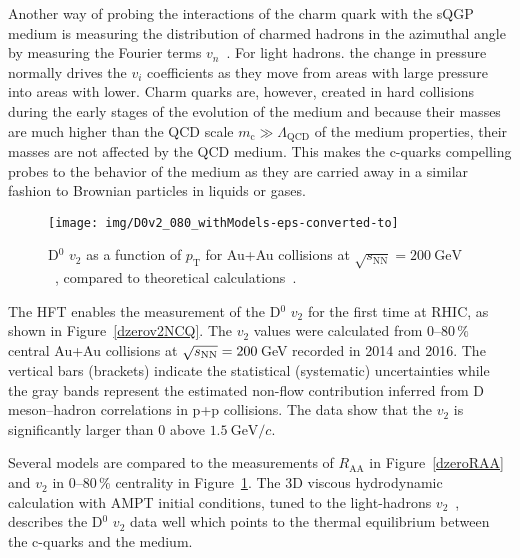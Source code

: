 Another way of probing the interactions of the charm quark with the sQGP medium is measuring the distribution of charmed hadrons in the azimuthal angle by measuring the Fourier terms $v_n$~\cite{StrangeAndChargedv2paper}\@. 
For light hadrons. the change in pressure normally drives the $v_i$ coefficients as they move from areas with large pressure into areas with lower. Charm quarks are, however, created in hard collisions during the early stages of the evolution of the medium and because their masses are much higher than the QCD scale $m_\mathrm{c} \gg \Lambda_\text{QCD}$ of the medium properties, their masses are not affected by the QCD medium. This makes the c-quarks compelling probes to the behavior of the medium as they are carried away in a similar fashion to Brownian particles in liquids or gases. 

\begin{figure}[!htb]
\begin{center}
 \texttt{[image: img/D0v2\_080\_withModels-eps-converted-to]}\\
\end{center}
\caption[D$^0$ $v_2$ as a function of $p_\mathrm{T}$.]{\label{dzerov2}D$^0$ $v_2$ as a function of $p_\mathrm{T}$ for Au+Au collisions
at $\sqrt{s_\mathrm{NN}} = \SI{200}{\giga\electronvolt}$~\cite{D0v2paper}, compared to theoretical calculations~\cite{PHSD2014,LBT,LBTprivate,TAMU,PHSD2015,SUBATECHvn,SUBATECHquenching,Duke,Duke2015,Hydro2012,Hydro2015}.}
\end{figure}


The HFT enables the measurement of the D$^0$ $v_2$ for the first 
time at RHIC, as shown in Figure~\ref{dzerov2NCQ}\@. The $v_2$ values were calculated from 0--80$\,\%$ central Au+Au collisions at $\sqrt{s_\text{NN}} = 200\,$GeV recorded in 2014 and 2016. The vertical bars (brackets) indicate 
the statistical (systematic)
uncertainties while the gray bands represent the estimated non-flow contribution inferred
from D meson--hadron correlations in p+p collisions. The data show that the $v_2$
is significantly larger than 0 above $\SI{1.5}{\giga\electronvolt}/c$\@.

Several models \cite{Hydro2012,Hydro2015,PHSD2014,LBT,LBTprivate,TAMU,PHSD2015,SUBATECHvn,SUBATECHquenching,Duke,Duke2015} are compared to the
measurements of $R_\mathrm{AA}$ in Figure~\ref{dzeroRAA} and $v_2$ in 0--80$\,\%$ centrality 
in Figure~\ref{dzerov2}\@. The 3D viscous hydrodynamic calculation with AMPT 
initial conditions, tuned to the light-hadrons $v_2$~\cite{Hydro2012,Hydro2015}, describes the D$^0$ $v_2$ data well 
which points to the thermal equilibrium between the c-quarks and the medium.

